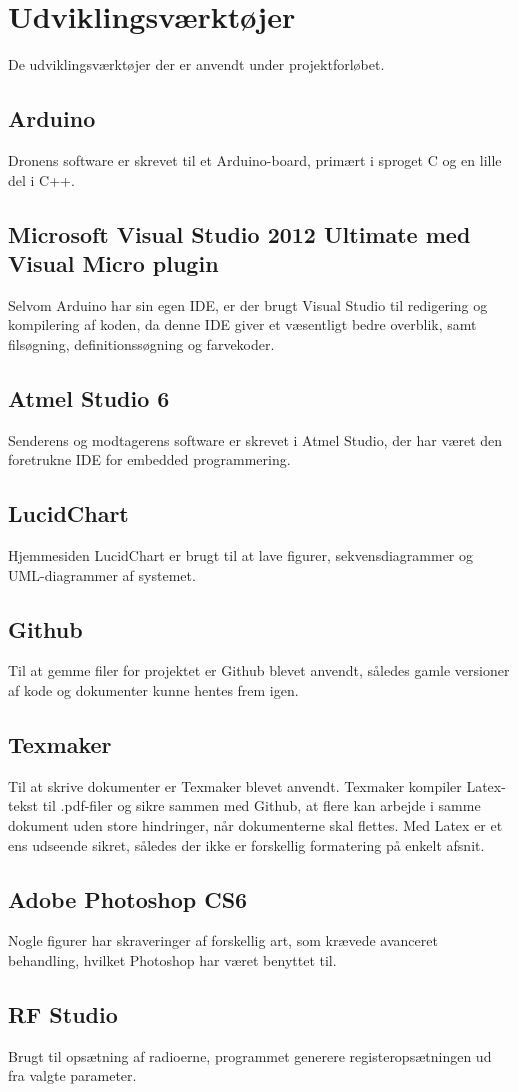 \documentclass[Main]{subfiles}
\begin{document}
\section{Udviklingsværktøjer}
De udviklingsværktøjer der er anvendt under projektforløbet.

\subsection{Arduino}
Dronens software er skrevet til et Arduino-board, primært i sproget C og en lille del i C++.

\subsection{Microsoft Visual Studio 2012 Ultimate med Visual Micro plugin}
Selvom Arduino har sin egen IDE, er der brugt Visual Studio til redigering og kompilering af koden, da denne IDE giver et væsentligt bedre overblik, samt filsøgning, definitionssøgning og farvekoder.

\subsection{Atmel Studio 6}
Senderens og modtagerens software er skrevet i Atmel Studio, der har været den foretrukne IDE for embedded programmering.

\subsection{LucidChart}
Hjemmesiden LucidChart er brugt til at lave figurer, sekvensdiagrammer og UML-diagrammer af systemet.

\subsection{Github}
Til at gemme filer for projektet er Github blevet anvendt, således gamle versioner af kode og dokumenter kunne hentes frem igen.

\subsection{Texmaker}
Til at skrive dokumenter er Texmaker blevet anvendt.
Texmaker kompiler Latex-tekst til .pdf-filer og sikre sammen med Github, at flere kan arbejde i samme dokument uden store hindringer, når dokumenterne skal flettes.
Med Latex er et ens udseende sikret, således der ikke er forskellig formatering på enkelt afsnit.

\subsection{Adobe Photoshop CS6}
Nogle figurer har skraveringer af forskellig art, som krævede avanceret behandling, hvilket Photoshop har været benyttet til.

\subsection{RF Studio}
Brugt til opsætning af radioerne, programmet generere registeropsætningen ud fra valgte parameter.
\end{document}
